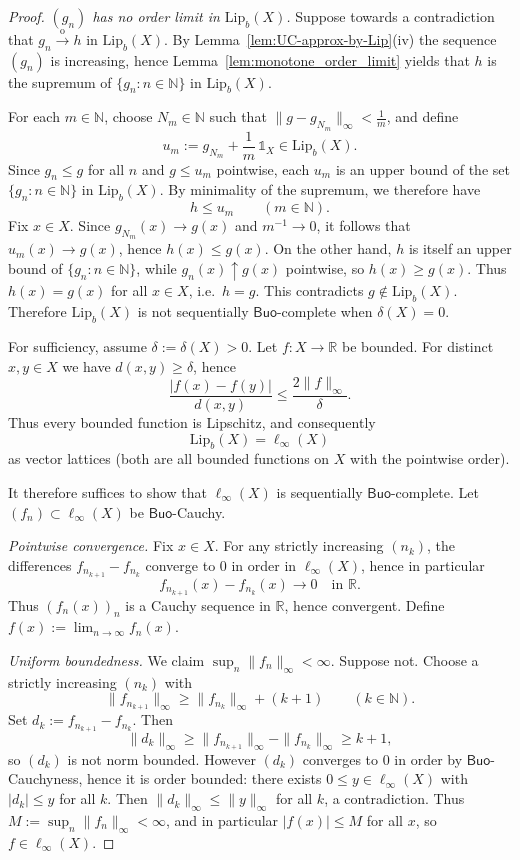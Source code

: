 \documentclass[10pt,a4paper]{amsart}
\newcommand{\Buo}{\ensuremath{\mathsf{Buo}}}
\newcommand{\N}{\mathbb{N}}
\newcommand{\R}{\mathbb{R}}
\renewcommand{\ge}{\geqslant}
\renewcommand{\le}{\leqslant}
\begin{document}
\begin{proof}
\smallskip\noindent
\emph{$(g_n)$ has no order limit in $\mathrm{Lip}_b(X)$.}
Suppose towards a contradiction that $g_n\xrightarrow{\mathrm{o}}h$ in
$\mathrm{Lip}_b(X)$. By Lemma~\ref{lem:UC-approx-by-Lip}\textup{(iv)} the
sequence $(g_n)$ is increasing, hence Lemma~\ref{lem:monotone_order_limit}
yields that $h$ is the supremum of $\{g_n:n\in\N\}$ in
$\mathrm{Lip}_b(X)$.

For each $m\in\N$, choose $N_m\in\N$ such that
$\|g-g_{N_m}\|_\infty<\tfrac1m$, and define
\[
u_m:=g_{N_m}+\frac1m\,\mathds{1}_X\in \mathrm{Lip}_b(X).
\]
Since $g_n\le g$ for all $n$ and $g\le u_m$ pointwise, each $u_m$ is an
upper bound of the set $\{g_n:n\in\N\}$ in $\mathrm{Lip}_b(X)$. By minimality
of the supremum, we therefore have
\[
h\le u_m\qquad(m\in\N).
\]
Fix $x\in X$. Since $g_{N_m}(x)\to g(x)$ and $m^{-1}\to 0$, it follows that
$u_m(x)\to g(x)$, hence $h(x)\le g(x)$. On the other hand, $h$ is itself an
upper bound of $\{g_n:n\in\N\}$, while $g_n(x)\uparrow g(x)$ pointwise, so
$h(x)\ge g(x)$. Thus $h(x)=g(x)$ for all $x\in X$, i.e.\ $h=g$.
This contradicts $g\notin \mathrm{Lip}_b(X)$.
Therefore $\mathrm{Lip}_b(X)$ is not sequentially \Buo-complete when
$\delta(X)=0$.

\medskip
\noindent For sufficiency, assume $\delta:=\delta(X)>0$.
Let $f:X\to\R$ be bounded. For distinct $x,y\in X$ we have $d(x,y)\ge\delta$, hence
\[
\frac{|f(x)-f(y)|}{d(x,y)}\le \frac{2\|f\|_\infty}{\delta}.
\]
Thus every bounded function is Lipschitz, and consequently
\[
\mathrm{Lip}_b(X)=\ell_\infty(X)
\]
as vector lattices (both are all bounded functions on $X$ with the pointwise order).

It therefore suffices to show that $\ell_\infty(X)$ is sequentially \Buo-complete.
Let $(f_n)\subset\ell_\infty(X)$ be \Buo-Cauchy.

\smallskip\noindent
\emph{Pointwise convergence.}
Fix $x\in X$. For any strictly increasing $(n_k)$, the differences
$f_{n_{k+1}}-f_{n_k}$ converge to $0$ in order in $\ell_\infty(X)$, hence in particular
\[
f_{n_{k+1}}(x)-f_{n_k}(x)\to0\quad\text{in }\R.
\]
Thus $(f_n(x))_n$ is a Cauchy sequence in $\R$, hence convergent.
Define $f(x):=\lim_{n\to\infty}f_n(x)$.

\smallskip\noindent
\emph{Uniform boundedness.}
We claim $\sup_n\|f_n\|_\infty<\infty$.
Suppose not. Choose a strictly increasing $(n_k)$ with
\[
\|f_{n_{k+1}}\|_\infty\ge \|f_{n_k}\|_\infty+(k+1)\qquad(k\in\N).
\]
Set $d_k:=f_{n_{k+1}}-f_{n_k}$. Then
\[
\|d_k\|_\infty\ge \|f_{n_{k+1}}\|_\infty-\|f_{n_k}\|_\infty\ge k+1,
\]
so $(d_k)$ is not norm bounded.
However $(d_k)$ converges to $0$ in order by \Buo-Cauchyness, hence it is order bounded:
there exists $0\le y\in\ell_\infty(X)$ with $|d_k|\le y$ for all $k$.
Then $\|d_k\|_\infty\le\|y\|_\infty$ for all $k$, a contradiction.
Thus $M:=\sup_n\|f_n\|_\infty<\infty$, and in particular $|f(x)|\le M$ for all $x$, so $f\in\ell_\infty(X)$.


\end{proof}
\end{document}
